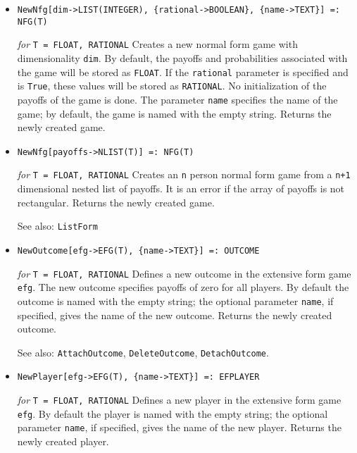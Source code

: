 \begin{itemize}
\item
\protect \large \begin{verbatim}
NewNfg[dim->LIST(INTEGER), {rational->BOOLEAN}, {name->TEXT}] =: NFG(T)
\end{verbatim}\normalsize

{\it for} {\tt T = FLOAT, RATIONAL}
\bd
Creates a new normal form game with dimensionality \verb+dim+.
By default, the payoffs and probabilities associated with the game will
be stored as {\tt FLOAT}.  If the \verb+rational+ parameter is specified
and is \verb+True+, these values will be stored as {\tt RATIONAL}.
No initialization of the payoffs of the game is done.
The parameter \verb+name+ specifies the name of the game; by default,
the game is named with the empty string.
Returns the newly created game.
\ed

\item
\protect \large \begin{verbatim}
NewNfg[payoffs->NLIST(T)] =: NFG(T) 
\end{verbatim}\normalsize

{\it for} {\tt T = FLOAT, RATIONAL} 
\bd 
Creates an \verb+n+ person normal form game from a \verb&n+1&
dimensional nested list of payoffs.  It is an error if the array of payoffs
is not rectangular.  Returns the newly created game.
\item [See also:] \verb+ListForm+
\ed

\item
\protect \large \begin{verbatim} 
NewOutcome[efg->EFG(T), {name->TEXT}] =: OUTCOME
\end{verbatim}\normalsize

{\it for} {\tt T = FLOAT, RATIONAL}
\bd
Defines a new outcome in the extensive form game \verb+efg+.
The new outcome specifies payoffs of zero for all players.
By default the outcome is named with the empty string; the optional parameter
\verb+name+, if specified, gives the name of the new outcome.  Returns the
newly created outcome.
\item [See also:] \verb+AttachOutcome+, \verb+DeleteOutcome+,
\verb+DetachOutcome+.
\ed

\item
\protect \large \begin{verbatim}
NewPlayer[efg->EFG(T), {name->TEXT}] =: EFPLAYER 
\end{verbatim}\normalsize

{\it for} {\tt T = FLOAT, RATIONAL}
\bd
Defines a new player in the extensive form game \verb+efg+.
By default the player is named with the empty string; the optional parameter
\verb+name+, if specified, gives the name of the new player.  Returns the
newly created player.
\ed


\end{itemize}
